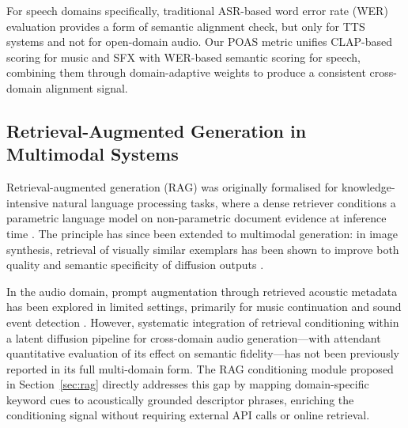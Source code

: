 \documentclass[journal]{IEEEtran}
\begin{document}
For speech domains specifically, traditional ASR-based word error
rate (WER) evaluation \cite{graves2006ctc} provides a form of semantic
alignment check, but only for TTS systems and not for open-domain audio.
Our POAS metric unifies CLAP-based scoring for music and SFX with
WER-based semantic scoring for speech, combining them through
domain-adaptive weights to produce a consistent cross-domain alignment
signal.

\subsection{Retrieval-Augmented Generation in Multimodal Systems}

Retrieval-augmented generation (RAG) was originally formalised for
knowledge-intensive natural language processing tasks, where a dense
retriever conditions a parametric language model on non-parametric
document evidence at inference time \cite{lewis2020rag}. The principle
has since been extended to multimodal generation: in image synthesis,
retrieval of visually similar exemplars has been shown to improve both
quality and semantic specificity of diffusion outputs
\cite{blattmann2022retrieval}.

In the audio domain, prompt augmentation through retrieved acoustic
metadata has been explored in limited settings, primarily for music
continuation and sound event detection \cite{sheffer2023hear}. However,
systematic integration of retrieval conditioning within a latent
diffusion pipeline for cross-domain audio generation---with attendant
quantitative evaluation of its effect on semantic fidelity---has not
been previously reported in its full multi-domain form. The RAG
conditioning module proposed in Section~\ref{sec:rag} directly
addresses this gap by mapping domain-specific keyword cues to
acoustically grounded descriptor phrases, enriching the conditioning
signal without requiring external API calls or online retrieval.
\end{document}
